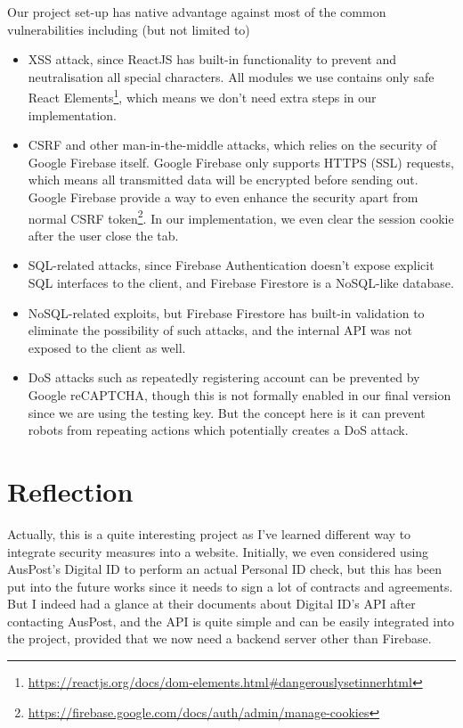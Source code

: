\documentclass[12pt]{article}
\begin{document}
Our project set-up has native advantage against most of the common vulnerabilities including (but not limited to)

\begin{itemize}
  \item XSS attack, since ReactJS has built-in functionality to prevent and neutralisation all special characters. All modules we use contains only safe React Elements\footnote{\url{https://reactjs.org/docs/dom-elements.html\#dangerouslysetinnerhtml}}, which means we don't need extra steps in our implementation.
  \item CSRF and other man-in-the-middle attacks, which relies on the security of Google Firebase itself. Google Firebase only supports HTTPS (SSL) requests, which means all transmitted data will be encrypted before sending out. Google Firebase provide a way to even enhance the security apart from normal CSRF token\footnote{\url{https://firebase.google.com/docs/auth/admin/manage-cookies}}. In our implementation, we even clear the session cookie after the user close the tab.
  \item SQL-related attacks, since Firebase Authentication doesn't expose explicit SQL interfaces to the client, and Firebase Firestore is a NoSQL-like database.
  \item NoSQL-related exploits, but Firebase Firestore has built-in validation to eliminate the possibility of such attacks, and the internal API was not exposed to the client as well.
  \item DoS attacks such as repeatedly registering account can be prevented by Google reCAPTCHA, though this is not formally enabled in our final version since we are using the testing key. But the concept here is it can prevent robots from repeating actions which potentially creates a DoS attack.
\end{itemize}

\section{Reflection}

Actually, this is a quite interesting project as I've learned different way to integrate security measures into a website. Initially, we even considered using AusPost's Digital ID to perform an actual Personal ID check, but this has been put into the future works since it needs to sign a lot of contracts and agreements. But I indeed had a glance at their documents about Digital ID's API after contacting AusPost, and the API is quite simple and can be easily integrated into the project, provided that we now need a backend server other than Firebase.
\end{document}
